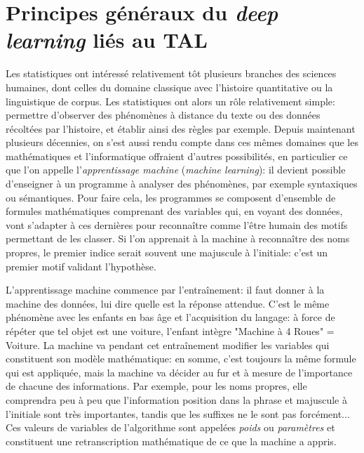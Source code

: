 \chapter{Principes généraux du \textit{deep learning} liés au TAL}

Les statistiques ont intéressé relativement tôt plusieurs branches des sciences humaines, dont celles du domaine classique avec l'histoire quantitative ou la linguistique de corpus. Les statistiques ont alors un rôle relativement simple: permettre d'observer des phénomènes à distance du texte ou des données récoltées par l'histoire, et établir ainsi des règles par exemple. Depuis maintenant plusieurs décennies, on s'est aussi rendu compte dans ces mêmes domaines que les mathématiques et l'informatique offraient d'autres possibilités, en particulier ce que l'on appelle l'\textit{apprentissage machine} (\textit{machine learning}): il devient possible d'enseigner à un programme à analyser des phénomènes, par exemple syntaxiques ou sémantiques. Pour faire cela, les programmes se composent d'ensemble de formules mathématiques comprenant des variables qui, en voyant des données, vont s'adapter à ces dernières pour reconnaître comme l'être humain des motifs permettant de les classer. Si l'on apprenait à la machine à reconnaître des noms propres, le premier indice serait souvent une majuscule à l'initiale: c'est un premier motif validant l'hypothèse.

L'apprentissage machine commence par l'entraînement: il faut donner à la machine des données, lui dire quelle est la réponse attendue. C'est le même phénomène avec les enfants en bas âge et l'acquisition du langage: à force de répéter que tel objet est une voiture, l'enfant intègre "Machine à 4 Roues" = Voiture. La machine va pendant cet entraînement modifier les variables qui constituent son modèle mathématique: en somme, c'est toujours la même formule qui est appliquée, mais la machine va décider au fur et à mesure de l'importance de chacune des informations. Par exemple, pour les noms propres, elle comprendra peu à peu que l'information position dans la phrase et majuscule à l'initiale sont très importantes, tandis que les suffixes ne le sont pas forcément... Ces valeurs de variables de l'algorithme sont appelées \textit{poids} ou \textit{paramètres} et constituent une retranscription mathématique de ce que la machine a appris. 

